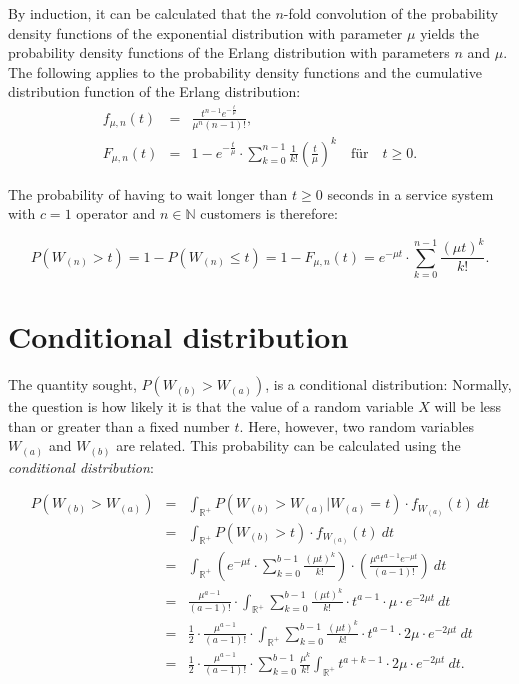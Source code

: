 \documentclass[a4paper,11pt,oneside]{article}
\begin{document}
By induction, it can be calculated that the $n$-fold convolution of the probability density functions of the exponential distribution with parameter $\mu$ yields the probability density functions of the Erlang distribution with parameters $n$ and $\mu$. The following applies to the probability density functions and the cumulative distribution function of the Erlang distribution:
\begin{eqnarray*}
f_{\mu,n}(t)&=&\frac{t^{n-1}e^{-\frac{t}{\mu}}}{\mu^n(n-1)!},\\
F_{\mu,n}(t)&=&1-e^{-\frac{t}{\mu}}\cdot\sum_{k=0}^{n-1}\frac{1}{k!}\left(\frac{t}{\mu}\right)^k \quad\text{für}\quad t\geq0.
\end{eqnarray*}

The probability of having to wait longer than $t\ge0$ seconds in a service system with $c=1$ operator and $n\in\mathbb{N}$ customers is therefore:

$$
P(W_{(n)}>t)=
1-P(W_{(n)}\le t)=
1-F_{\mu,n}(t)=
e^{-\mu t}\cdot\sum_{k=0}^{n-1}\frac{(\mu t)^k}{k!}.
$$



\section{Conditional distribution}

The quantity sought, $P(W_{(b)}>W_{(a)})$, is a conditional distribution: Normally, the question is how likely it is that the value of a random variable $X$ will be less than or greater than a fixed number $t$. Here, however, two random variables $W_{(a)}$ and $W_{(b)}$ are related. This probability can be calculated using the \emph{conditional distribution}:

\begin{eqnarray*}
P(W_{(b)}>W_{(a)})&=&
\int_{\mathbb{R}^+}P(W_{(b)}>W_{(a)}|W_{(a)}=t)\cdot f_{W_{(a)}}(t)~dt\\
~&=&
\int_{\mathbb{R}^+}P(W_{(b)}>t)\cdot f_{W_{(a)}}(t)~dt\\
~&=&
\int_{\mathbb{R}^+}
\left(e^{-\mu t}\cdot\sum_{k=0}^{b-1}\frac{(\mu t)^k}{k!}\right)\cdot\left(\frac{\mu^at^{a-1}e^{-\mu t}}{(a-1)!}\right)~dt\\
~&=&
\frac{\mu^{a-1}}{(a-1)!}\cdot\int_{\mathbb{R}^+}\sum_{k=0}^{b-1}\frac{(\mu t)^k}{k!}\cdot t^{a-1}\cdot\mu\cdot e^{-2\mu t}~dt\\
~&=&
\frac{1}{2}\cdot\frac{\mu^{a-1}}{(a-1)!}\cdot\int_{\mathbb{R}^+}\sum_{k=0}^{b-1}\frac{(\mu t)^k}{k!}\cdot t^{a-1}\cdot2\mu\cdot e^{-2\mu t}~dt\\
~&=&
\frac{1}{2}\cdot\frac{\mu^{a-1}}{(a-1)!}\cdot\sum_{k=0}^{b-1} \frac{\mu^k}{k!}\int_{\mathbb{R}^+}t^{a+k-1}\cdot2\mu\cdot e^{-2\mu t}~dt.
\end{eqnarray*}
\end{document}
